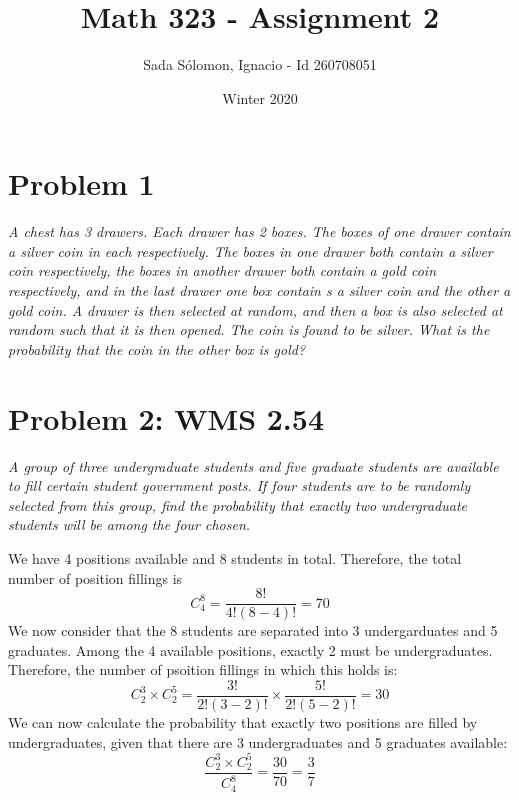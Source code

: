 \documentclass{article}
\title{Math 323
	- Assignment 2}
\author{Sada S\'{o}lomon, Ignacio - Id 260708051}
\date{Winter 2020}  %
\begin{document}
\clearpage\maketitle
\thispagestyle{empty}
\vspace{2cm}

\newpage
\setcounter{page}{1}
\cfoot{\thepage}

\pagebreak

\section*{Problem 1}
	\emph{A chest has 3 drawers. Each drawer has 2 boxes. The boxes of one drawer contain a silver coin in each respectively. The boxes in one drawer both contain a silver coin respectively, the boxes in another drawer both contain a gold coin respectively, and in the last drawer one box contain s a silver coin and the other a gold coin. A drawer is then selected at random, and then a box is also selected at random such that it is then opened. The coin is found to be silver. What is the probability that the coin in the other box is gold?}

\pagebreak

\section*{Problem 2: WMS 2.54}
	\emph{A group of three undergraduate students and five graduate students are available to fill certain student government posts. If four students are to be randomly selected from this group, find the probability that exactly two undergraduate students will be among the four chosen.}
	
	\begin{sol}
		We have 4 positions available and 8 students in total. Therefore, the total number of position fillings is
		$$ C_4^8 = \frac{8!}{4! (8-4)!} = 70$$
		We now consider that the 8 students are separated into 3 undergarduates and 5 graduates. Among the 4 available positions, exactly 2 must be undergraduates. Therefore, the number of psoition fillings in which this holds is:
		$$ C_2^3 \times C_2^5 = \frac{3!}{2! (3-2)!} \times  \frac{5!}{2!(5-2)!} = 30$$
		We can now calculate the probability that exactly two positions are filled by undergraduates, given that there are 3 undergraduates and 5 graduates available:
		$$ \frac{C_2^3 \times C_2^5}{C_4^8} = \frac{30}{70} = \boxed{\frac37}$$
		
	\end{sol}
\end{document}
